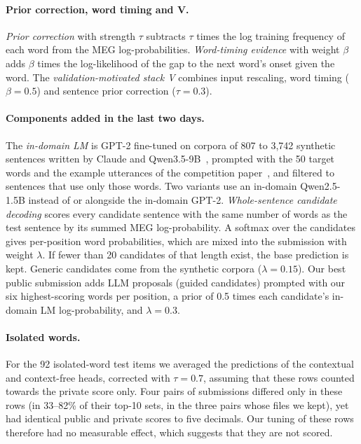 \documentclass{article}
\begin{document}
\paragraph{Prior correction, word timing and V.} \emph{Prior correction} with strength $\tau$ subtracts $\tau$ times the log training frequency of each word from the MEG log-probabilities. \emph{Word-timing evidence} with weight $\beta$ adds $\beta$ times the log-likelihood of the gap to the next word's onset given the word. The \emph{validation-motivated stack V} combines input rescaling, word timing ($\beta=0.5$) and sentence prior correction ($\tau=0.3$).

\paragraph{Components added in the last two days.} The \emph{in-domain LM} is GPT-2 fine-tuned on corpora of 807 to 3{,}742 synthetic sentences written by Claude and Qwen3.5-9B~\cite{qwen35}, prompted with the 50 target words and the example utterances of the competition paper~\cite{pnpl2026}, and filtered to sentences that use only those words. Two variants use an in-domain Qwen2.5-1.5B instead of or alongside the in-domain GPT-2. \emph{Whole-sentence candidate decoding} scores every candidate sentence with the same number of words as the test sentence by its summed MEG log-probability. A softmax over the candidates gives per-position word probabilities, which are mixed into the submission with weight $\lambda$. If fewer than 20 candidates of that length exist, the base prediction is kept. Generic candidates come from the synthetic corpora ($\lambda=0.15$). Our best public submission adds LLM proposals (guided candidates) prompted with our six highest-scoring words per position, a prior of 0.5 times each candidate's in-domain LM log-probability, and $\lambda=0.3$.

\paragraph{Isolated words.} For the 92 isolated-word test items we averaged the predictions of the contextual and context-free heads, corrected with $\tau=0.7$, assuming that these rows counted towards the private score only. Four pairs of submissions differed only in these rows (in 33--82\% of their top-10 sets, in the three pairs whose files we kept), yet had identical public and private scores to five decimals. Our tuning of these rows therefore had no measurable effect, which suggests that they are not scored.
\end{document}
